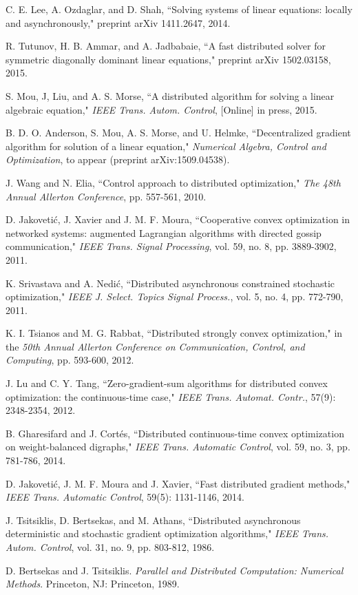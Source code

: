 \documentclass[a4paper, 11pt]{article}
\begin{document}
\begin{thebibliography}{99}
 C. E. Lee, A. Ozdaglar, and D. Shah, ``Solving systems of linear equations: locally and asynchronously," preprint  arXiv 1411.2647, 2014.

R. Tutunov, H. B. Ammar, and A. Jadbabaie,  ``A fast distributed solver for symmetric diagonally dominant linear equations,"  preprint  arXiv 1502.03158, 2015.




 S.  Mou,  J, Liu, and  A. S.  Morse, ``A distributed algorithm for solving a linear algebraic equation," {\em IEEE Trans. Autom. Control},  [Online] in press, 2015.

 B. D. O. Anderson, S. Mou, A. S. Morse, and U. Helmke, ``Decentralized gradient algorithm for solution
of a linear equation," {\em Numerical Algebra, Control and Optimization}, to appear (preprint arXiv:1509.04538).



 J. Wang and N.  Elia,  ``Control approach to distributed optimization," {\em The 48th  Annual Allerton Conference}, pp. 557-561, 2010.


 D.  Jakoveti\'{c}, J. Xavier and J. M. F. Moura, ``Cooperative convex optimization in networked
systems: augmented Lagrangian algorithms
with directed gossip communication," {\em IEEE Trans. Signal Processing}, vol. 59, no. 8, pp. 3889-3902, 2011.

K. Srivastava and A. Nedi\'{c}, ``Distributed asynchronous constrained
stochastic optimization," {\em IEEE J. Select. Topics Signal Process.}, vol. 5,
no. 4, pp. 772-790, 2011.

 K. I. Tsianos and M. G. Rabbat, ``Distributed strongly convex optimization," in the {\em 50th Annual Allerton Conference on Communication, Control,
and Computing}, pp. 593-600, 2012.

 J. Lu and C. Y. Tang, ``Zero-gradient-sum algorithms for distributed convex optimization: the continuous-time case," {\em IEEE Trans. Automat. Contr.}, 57(9): 2348-2354, 2012.


 B. Gharesifard and  J. Cort\'{e}s, ``Distributed continuous-time convex optimization on weight-balanced digraphs," {\em IEEE Trans.  Automatic Control}, vol. 59, no. 3, pp. 781-786, 2014.

 D. Jakoveti\'{c}, J. M. F. Moura and J. Xavier, ``Fast distributed gradient methods," {\em IEEE
Trans. Automatic Control}, 59(5):  1131-1146, 2014.

J. Tsitsiklis, D. Bertsekas, and M. Athans, ``Distributed asynchronous
deterministic and stochastic gradient optimization algorithms," {\em IEEE Trans. Autom. Control}, vol. 31, no. 9, pp. 803-812, 1986.

 D. Bertsekas and J. Tsitsiklis. {\em Parallel and Distributed Computation:
Numerical Methods}. Princeton, NJ: Princeton, 1989.

\end{thebibliography}
\end{document}
